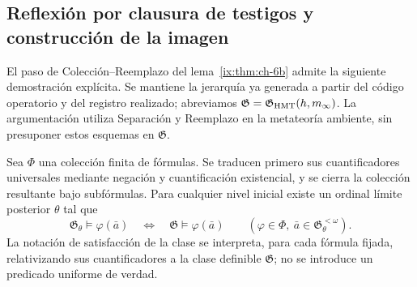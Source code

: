 \subsection{Reflexión por clausura de testigos y construcción de la imagen}
\label{empalme:reflexion-testigos}
El paso de Colección--Reemplazo del lema~\ref{ix:thm:ch-6b} admite la siguiente
demostración explícita. Se mantiene la jerarquía ya generada a partir del
código operatorio y del registro realizado; abreviamos
\(\mathfrak G=\mathfrak G_{\rm HMT}(h,m_\infty)\).
La argumentación utiliza Separación y Reemplazo en la metateoría ambiente,
sin presuponer estos esquemas en \(\mathfrak G\).

Sea \(\Phi\) una colección finita de fórmulas. Se traducen primero sus
cuantificadores universales mediante negación y cuantificación existencial,
y se cierra la colección resultante bajo subfórmulas. Para cualquier nivel
inicial existe un ordinal límite posterior \(\theta\) tal que
\[
 \mathfrak G_\theta\models\varphi(\bar a)
 \quad\Longleftrightarrow\quad
 \mathfrak G\models\varphi(\bar a)
 \qquad
 (\varphi\in\Phi,\ \bar a\in\mathfrak G_\theta^{<\omega}).
\]
La notación de satisfacción de la clase se interpreta, para cada fórmula
fijada, relativizando sus cuantificadores a la clase definible
\(\mathfrak G\); no se introduce un predicado uniforme de verdad.

